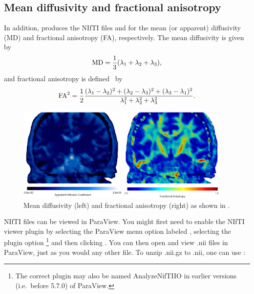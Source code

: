 \subsection{Mean diffusivity and fractional anisotropy}
In addition,  produces the NIfTI files
 and  for the mean (or apparent)
diffusivity (MD) and fractional anisotropy (FA), respectively. 
The mean diffusivity is given by 
\begin{equation}\label{eqn:chp5:md}
  \rm{MD} = \frac{1}{3}(\lambda_1 + \lambda_2 + \lambda_3),   
\end{equation}
and  fractional
anisotropy is defined~\cite{kindlmann2007geodesic} by
\begin{equation}\label{eqn:chp5:fa}
	\rm{FA}^2 = \frac{1}{2} \frac{(\lambda_1-\lambda_2)^2 
+ (\lambda_2 - \lambda_3)^2 + (\lambda_3 - \lambda_1)^2}{\lambda_1^2 
+ \lambda_2^2 + \lambda_3^2} . 
\end{equation}
\begin{figure}	
  \begin{center}
    \includegraphics[width=0.95\textwidth]{./graphics/chp5/paraview_adcfa.png}
  \end{center}
  \caption{Mean diffusivity (left) and fractional anisotropy (right) as shown in .}
  \label{fig:chp5:DTIfa}
\end{figure}
NIfTI files can be viewed in ParaView. You might first need to enable
the NIfTI viewer plugin by selecting the ParaView menu option labeled
, selecting the plugin option%
\footnote{The correct plugin may also be named AnalyzeNifTIIO in earlier 
versions (i.e.~before 5.7.0) of ParaView.} 
 and then clicking . You
can then open and view .nii files in ParaView, just as you would any other
file. To unzip .nii.gz to .nii, one can use :

